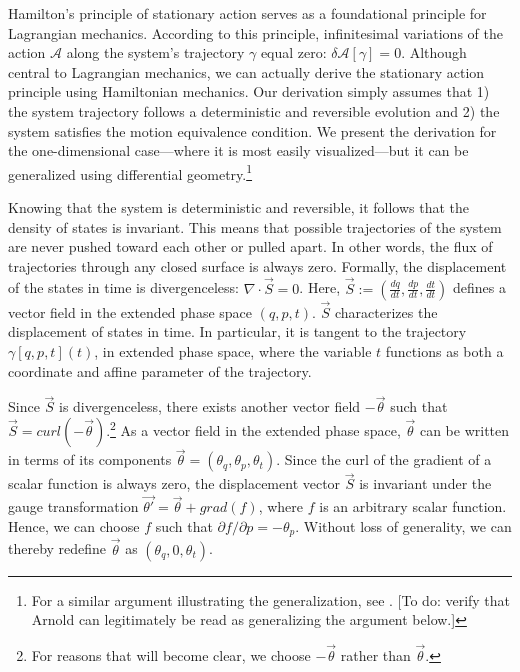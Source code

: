 \documentclass[letterpaper]{article}
\renewcommand{\vector}[1]{\ensuremath{\vec{#1}}} %
\begin{document}

Hamilton's principle of stationary action serves as a foundational principle for Lagrangian mechanics. According to this principle, infinitesimal variations of the action $ \mathscr{A}$ along the system's trajectory $\gamma $ equal zero: $\delta  \mathscr{A}[\gamma] = 0 $. Although central to Lagrangian mechanics, we can actually derive the stationary action principle using Hamiltonian mechanics. Our derivation simply assumes that 1) the system trajectory follows a deterministic and reversible evolution and 2) the system satisfies the motion equivalence condition. We present the derivation for the one-dimensional case---where it is most easily visualized---but it can be generalized using differential geometry.\footnote{For a similar argument illustrating the generalization, see \textcites[110]{Arnold}. [To do: verify that Arnold can legitimately be read as generalizing the argument below.]}

Knowing that the system is deterministic and reversible, it follows that the density of states is invariant. This means that possible trajectories of the system are never pushed toward each other or pulled apart. In other words, the flux of trajectories through any closed surface is always zero. Formally, the displacement of the states in time is divergenceless: $\nabla \cdot \vector{S} = 0 $. Here, $\vec{S} := (\frac{d q }{d t }, \frac{d p }{d t }, \frac{d t }{d t })$ defines a vector field in the extended phase space $(q, p , t ) $. $\vector{S}$ characterizes the displacement of states in time. In particular, it is tangent to the trajectory $\gamma [q, p, t] (t)$, in extended phase space, where the variable $t$ functions as both a coordinate and affine parameter of the trajectory. 

Since $\vector{S}$ is divergenceless, there exists another vector field $-\vector{\theta}$ such that $\vector{S} = curl(-\vector{\theta} )$.\footnote{For reasons that will become clear, we choose $-\vector{\theta}$ rather than $\vector{\theta}$.} As a vector field in the extended phase space, $\vector{\theta}$ can be written in terms of its components $\vector{\theta} = (\theta_q, \theta_p, \theta_t) $. Since the curl of the gradient of a scalar function is always zero, the displacement vector $\vector{S}$ is invariant under the gauge transformation $\vector{\theta'} =\vector{\theta} + grad(f)$, where $f$ is an arbitrary scalar function. Hence, we can choose $f$ such that $\partial f/ \partial p = -\theta_p $. Without loss of generality, we can thereby redefine $\vector{\theta}$ as $(\theta_q, 0, \theta_t) $.
\end{document}
